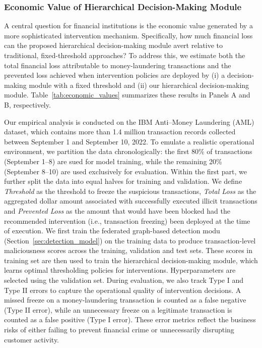 \subsubsection{Economic Value of Hierarchical Decision-Making Module}
A central question for financial institutions is the economic value generated by a more sophisticated intervention mechanism. Specifically, how much financial loss can the proposed hierarchical decision-making module avert relative to traditional, fixed-threshold approaches? To address this, we estimate both the total financial loss attributable to money-laundering transactions and the prevented loss achieved when intervention policies are deployed by (i) a decision-making module with a fixed threshold and (ii) our hierarchical decision-making module. Table~\ref{tab:economic_values} summarizes these results in Panels A and B, respectively.

Our empirical analysis is conducted on the IBM Anti–Money Laundering (AML) dataset, which contains more than 1.4 million transaction records collected between September 1 and September 10, 2022. To emulate a realistic operational environment, we partition the data chronologically: the first 80\% of transactions (September 1–8) are sued for model training, while the remaining 20\% (September 8–10) are used exclusively for evaluation. Within the first part, we further split the data into equal halves for training and validation. We define  \textit{Threshold} as the threshold to freeze the suspicious transactions, \textit{Total Loss} as the aggregated dollar amount associated with successfully executed illicit transactions and \textit{Prevented Loss} as the amount that would have been blocked had the recommended intervention (i.e., transaction freezing) been deployed at the time of execution. We first train the federated graph-based detection modu (Section~\ref{sec:detection_model}) on the training data to produce transaction-level maliciousness scores across the training, validation and test sets. These scores in training set are then used to train the hierarchical decision-making module, which learns optimal thresholding policies for interventions. Hyperparameters are selected using the validation set. During evaluation, we also track Type I and Type II errors to capture the operational quality of intervention decisions. A missed freeze on a money-laundering transaction is counted as a false negative (Type II error), while an unnecessary freeze on a legitimate transaction is counted as a false positive (Type I error). These error metrics reflect the business risks of either failing to prevent financial crime or unnecessarily disrupting customer activity.


